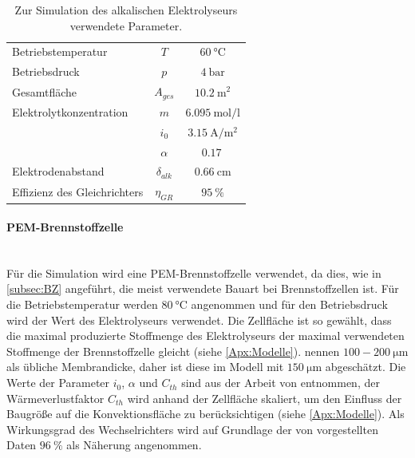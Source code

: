 \begin{table}[ht]
		\centering
		\caption{Zur Simulation des alkalischen Elektrolyseurs verwendete Parameter.}
		\begin{tabular}{l c c}
		\toprule
		Betriebstemperatur & $T$ & $\SI{60}{\degreeCelsius}$\\
		Betriebsdruck & $p$ & $\SI{4}{\bar}$\\
		Gesamtfläche & $A_{ges}$ & $\SI{10,2}{\m\squared }$\\
		Elektrolytkonzentration & $m$ & $\SI{6,095}{\mol \per \l}$\\
		 & $i_0$ & $ \SI{3,15}{\A\per\m\squared}$\\
		 & $\alpha$ & $\SI{0,17}{}$\\
		Elektrodenabstand & $\delta_{alk}$ & $\SI{0,66}{\cm}$\\
		Effizienz des Gleichrichters & $\eta_{GR}$ & $\SI{95}{\%}$ \\
		\bottomrule
		\end{tabular}
		\label{tb:ParameterElektrolyseur}
\end{table}	

\paragraph{PEM-Brennstoffzelle}\ \\
Für die Simulation wird eine PEM-Brennstoffzelle verwendet, da dies, wie in \ref{subsec:BZ} angeführt, die meist verwendete Bauart bei Brennstoffzellen ist. Für die Betriebstemperatur werden $\SI{80}{\degreeCelsius}$ angenommen und für den Betriebsdruck wird der Wert des Elektrolyseurs verwendet. Die Zellfläche ist so gewählt, dass die maximal produzierte Stoffmenge des Elektrolyseurs der maximal verwendeten Stoffmenge der Brennstoffzelle gleicht (siehe \ref{Apx:Modelle}). \citet{rashid_hydrogen_2015} nennen $100-\SI{200}{\micro\m}$ als übliche Membrandicke, daher ist diese im Modell mit $\SI{150}{\micro\m}$ abgeschätzt.
Die Werte der Parameter $i_0$, $\alpha$ und $C_{th}$ sind aus der Arbeit von \citet{webster_implementation_2019} entnommen, der Wärmeverlustfaktor $C_{th}$ wird anhand der Zellfläche skaliert, um den Einfluss der Baugröße auf die Konvektionsfläche zu berücksichtigen (siehe \ref{Apx:Modelle}). 
Als Wirkungsgrad des Wechselrichters wird auf Grundlage der von \citet{trubitsyn_high-efficiency_2010} vorgestellten Daten $\SI{96}{\%}$ als Näherung angenommen.

